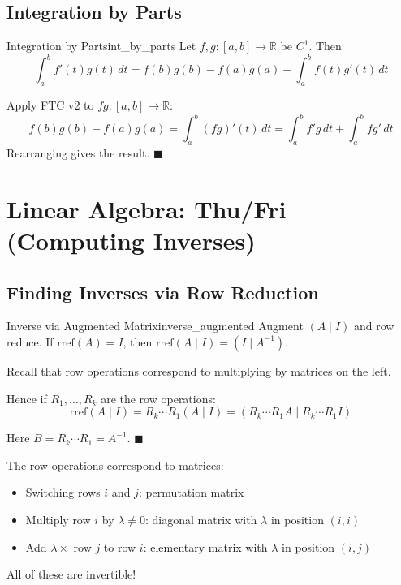\documentclass[11pt, letterpaper, openany]{book}
\renewenvironment{proof}[1][\proofname]{%
  \tcolorbox[blanker, breakable, left=1em,
    before skip=1em, after skip=1em,
    borderline west={2pt}{0pt}{MagicTeal!50},
    colback=MagicCream,
    before upper={\textcolor{MagicTeal}{\sffamily\bfseries #1.}\space}
  ]%
}{%
  \hfill\textcolor{MagicTeal}{\ensuremath{\blacksquare}}\endtcolorbox%
}
\begin{document}
\subsection{Integration by Parts}

\begin{thm}{Integration by Parts}{int_by_parts}
Let $f, g: [a,b] \to \mathbb{R}$ be $C^1$. Then
\[\int_a^b f'(t) g(t) \, dt = f(b)g(b) - f(a)g(a) - \int_a^b f(t) g'(t) \, dt\]
\end{thm}

\begin{proof}
Apply FTC v2 to $fg: [a,b] \to \mathbb{R}$:
\[f(b)g(b) - f(a)g(a) = \int_a^b (fg)'(t) \, dt = \int_a^b f'g \, dt + \int_a^b fg' \, dt\]
Rearranging gives the result.
\end{proof}

\section{Linear Algebra: Thu/Fri (Computing Inverses)}

\subsection{Finding Inverses via Row Reduction}

\begin{thm}{Inverse via Augmented Matrix}{inverse_augmented}
Augment $(A \mid I)$ and row reduce. If $\text{rref}(A) = I$, then $\text{rref}(A \mid I) = (I \mid A^{-1})$.
\end{thm}

\begin{proof}
Recall that row operations correspond to multiplying by matrices on the left.

Hence if $R_1, \ldots, R_k$ are the row operations:
\[\text{rref}(A \mid I) = R_k \cdots R_1 (A \mid I) = (R_k \cdots R_1 A \mid R_k \cdots R_1 I)\]

Here $B = R_k \cdots R_1 = A^{-1}$.
\end{proof}

\begin{remark}
The row operations correspond to matrices:
\begin{itemize}
    \item Switching rows $i$ and $j$: permutation matrix
    \item Multiply row $i$ by $\lambda \neq 0$: diagonal matrix with $\lambda$ in position $(i,i)$
    \item Add $\lambda \times$ row $j$ to row $i$: elementary matrix with $\lambda$ in position $(i,j)$
\end{itemize}
All of these are invertible!
\end{remark}
\end{document}
